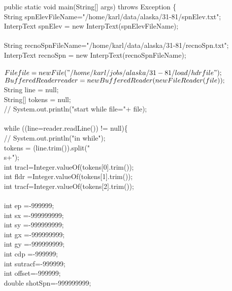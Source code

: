     public static void main(String[] args) throws Exception \{ \\
        String spnElevFileName="/home/karl/data/alaska/31-81/spnElev.txt"; \\
        InterpText spnElev = new InterpText(spnElevFileName); \\
         \\
        String recnoSpnFileName="/home/karl/data/alaska/31-81/recnoSpn.txt"; \\
        InterpText recnoSpn = new InterpText(recnoSpnFileName); \\
 \\
       $ File file= new File("/home/karl/jobs/alaska/31-\\
81/load/hdrfile");$ \\
       $ BufferedReader reader = new BufferedReader\\
(new FileReader(file));$ \\
        String line = null; \\
        String[] tokens = null; \\
	// System.out.println("start while file="+ file); \\
 \\
        while ((line=reader.readLine()) != null)\{ \\
	    // System.out.println("in while"); \\
            tokens = (line.trim()).split("\\s+"); \\
            int tracl=Integer.valueOf(tokens[0].trim()); \\
            int fldr =Integer.valueOf(tokens[1].trim()); \\
            int tracf=Integer.valueOf(tokens[2].trim()); \\
 \\
            int ep    =-999999; \\
            int sx    =-999999999; \\
            int sy    =-999999999; \\
            int gx    =-999999999; \\
            int gy    =-999999999; \\
            int cdp   =-999999; \\
            int sutracf=-999999; \\
            int offset=-999999; \\
            double shotSpn=-999999999; \\
